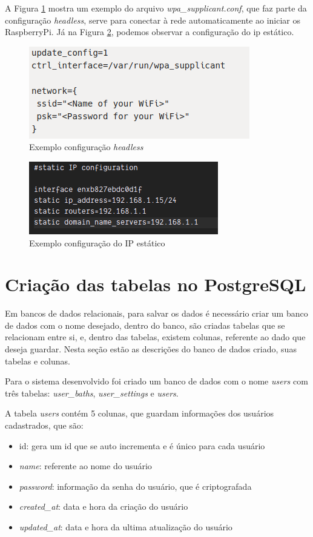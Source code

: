A Figura \ref{fig:headless} mostra um exemplo do arquivo \textit{wpa\_supplicant.conf}, que faz parte da configuração \textit{headless}, serve para conectar à rede automaticamente ao iniciar os RaspberryPi. Já na Figura \ref{fig:rpiip}, podemos observar a configuração do ip estático.

\begin{figure}[htbp]
	\centering
	\includegraphics[width=0.6\linewidth]{figuras/headless.png}
	\caption{Exemplo configuração \textit{headless}}
	\label{fig:headless}
\end{figure}

\begin{figure}[htbp]
	\centering
	\includegraphics[width=0.6\linewidth]{figuras/rpiip.png}
	\caption{Exemplo configuração do IP estático}
	\label{fig:rpiip}
\end{figure}

\section{Criação das tabelas no PostgreSQL}

Em bancos de dados relacionais, para salvar os dados é necessário criar um banco de dados com o nome desejado,  dentro do banco, são criadas tabelas que se relacionam entre si, e, dentro das tabelas, existem colunas, referente ao dado que deseja guardar. Nesta seção estão as descrições do banco de dados criado, suas tabelas e colunas.

Para o sistema desenvolvido foi criado um banco de dados com o nome \textit{users} com três tabelas: \textit{user\_baths}, \textit{user\_settings} e \textit{users}.

A tabela \textit{users} contém 5 colunas, que guardam informações dos usuários cadastrados, que são:
\begin{itemize}
	\item id: gera um id que se auto incrementa e é único para cada usuário
	\item \textit{name}: referente ao nome do usuário
	\item \textit{password}: informação da senha do usuário, que é criptografada
	\item \textit{created\_at}: data e hora da criação do usuário
	\item \textit{updated\_at}: data e hora da ultima atualização do usuário
\end{itemize}

